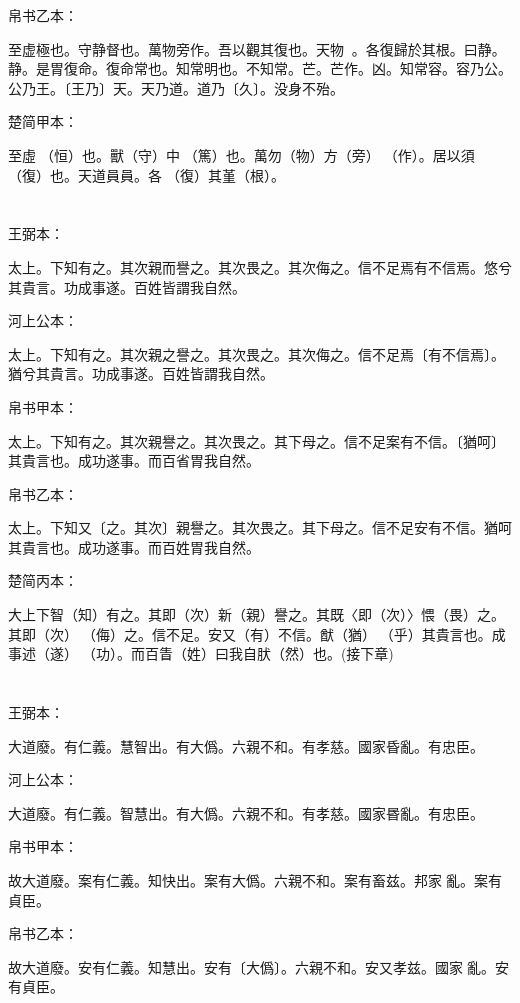 \documentclass[a5paper]{ctexbook}
\begin{document}
    帛书乙本：

    至虚極也。守静督也。萬物旁作。吾以觀其復也。天物𥘟𥘟。各復歸於其根。曰静。静。是胃復命。復命常也。知常明也。不知常。芒。芒作。凶。知常容。容乃公。公乃王。〔王乃〕天。天乃道。道乃〔久〕。没身不殆。

    楚简甲本：

    至虛𠄨（恒）也。獸（守）中󶴮（篤）也。萬勿（物）方（旁）󶴮（作）。居以須󵯿（復）也。天道員員。各󵯿（復）其堇（根）。

    \chapter{}
    王弼本：

    太上。下知有之。其次親而譽之。其次畏之。其次侮之。信不足焉有不信焉。悠兮其貴言。功成事遂。百姓皆謂我自然。

    河上公本：

    太上。下知有之。其次親之譽之。其次畏之。其次侮之。信不足焉〔有不信焉〕。猶兮其貴言。功成事遂。百姓皆謂我自然。

    帛书甲本：

    太上。下知有之。其次親譽之。其次畏之。其下母之。信不足案有不信。〔猶呵〕其貴言也。成功遂事。而百省胃我自然。

    帛书乙本：

    太上。下知又〔之。其次〕親譽之。其次畏之。其下母之。信不足安有不信。猶呵其貴言也。成功遂事。而百姓胃我自然。

    楚简丙本：

    大上下智（知）有之。其即（次）新（親）譽之。其既〈即（次）〉愄（畏）之。其即（次）󶵡（侮）之。信不足。安又（有）不信。猷（猶）󶴋（乎）其貴言也。成事述（遂）𬒬（功）。而百眚（姓）曰我自肰（然）也。(接下章)

    \chapter{}
    王弼本：

    大道廢。有仁義。慧智出。有大僞。六親不和。有孝慈。國家昏亂。有忠臣。

    河上公本：

    大道廢。有仁義。智慧出。有大僞。六親不和。有孝慈。國家昬亂。有忠臣。

    帛书甲本：

    故大道廢。案有仁義。知快出。案有大僞。六親不和。案有畜兹。邦家𨴽亂。案有貞臣。

    帛书乙本：

    故大道廢。安有仁義。知慧出。安有〔大僞〕。六親不和。安又孝兹。國家𨴽亂。安有貞臣。
\end{document}
